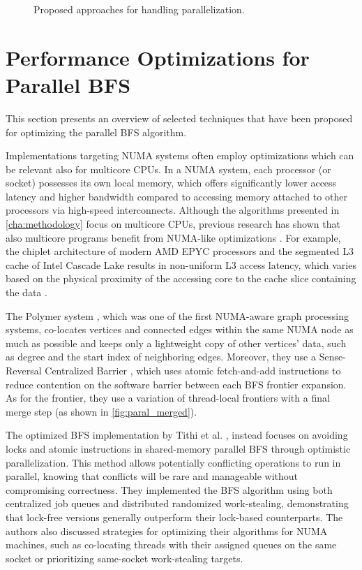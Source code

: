 \begin{figure}[h!]
    \caption{Proposed approaches for handling parallelization.}
    \label{fig:parallelization}
\end{figure}

\section{Performance Optimizations for Parallel BFS}
\label{sec:optimizations}
This section presents an overview of selected techniques that have been proposed for optimizing the parallel BFS algorithm.

Implementations targeting NUMA systems often employ optimizations which can be relevant also for multicore CPUs. In a NUMA system, each processor (or socket) possesses its own local memory, which offers significantly lower access latency and higher bandwidth compared to accessing memory attached to other processors via high-speed interconnects. Although the algorithms presented in \cref{cha:methodology} focus on multicore CPUs, previous research has shown that also multicore programs benefit from NUMA-like optimizations \cite{blagodurov2010case}. For example, the chiplet architecture of modern AMD EPYC processors and the segmented L3 cache of Intel Cascade Lake results in non-uniform L3 access latency, which varies based on the physical proximity of the accessing core to the cache slice containing the data \cite{velten2022memory}.

The Polymer system \cite{zhang2015numa}, which was one of the first NUMA-aware graph processing systems, co-locates vertices and connected edges within the same NUMA node as much as possible and keeps only a lightweight copy of other vertices' data, such as degree and the start index of neighboring edges. Moreover, they use a Sense-Reversal Centralized Barrier \cite{mellor1991algorithms}, which uses atomic fetch-and-add instructions to reduce contention on the software barrier between each BFS frontier expansion. As for the frontier, they use a variation of thread-local frontiers with a final merge step (as shown in \cref{fig:paral_merged}).

The optimized BFS implementation by Tithi et al. \cite{tithi2013avoiding}, instead focuses on avoiding locks and atomic instructions in shared-memory parallel BFS through optimistic parallelization. This method allows potentially conflicting operations to run in parallel, knowing that conflicts will be rare and manageable without compromising correctness. They implemented the BFS algorithm using both centralized job queues and distributed randomized work-stealing, demonstrating that lock-free versions generally outperform their lock-based counterparts. The authors also discussed strategies for optimizing their algorithms for NUMA machines, such as co-locating threads with their assigned queues on the same socket or prioritizing same-socket work-stealing targets.

